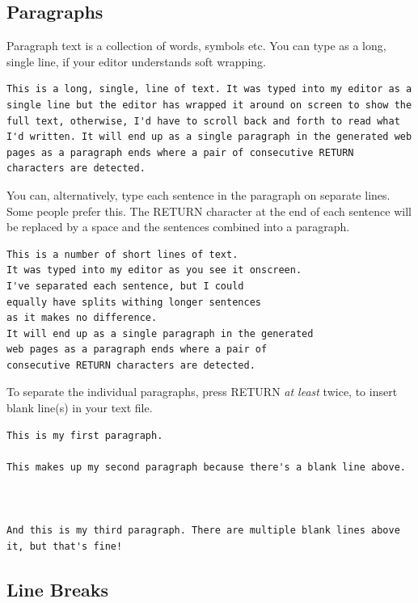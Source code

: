 \subsection{Paragraphs}\label{sect: Paragraphs}

Paragraph text is a collection of words, symbols etc. You can type as a long, single line, if your editor understands soft wrapping.

\begin{lstlisting}[caption={Paragraphs using long lines.},style=myText]
This is a long, single, line of text. It was typed into my editor as a single line but the editor has wrapped it around on screen to show the full text, otherwise, I'd have to scroll back and forth to read what I'd written. It will end up as a single paragraph in the generated web pages as a paragraph ends where a pair of consecutive RETURN characters are detected.
\end{lstlisting}


You can, alternatively, type each sentence in the paragraph on separate lines. Some people prefer this. The RETURN character at the end of each sentence will be replaced by a space and the sentences combined into a paragraph.

\begin{lstlisting}[caption={Paragraphs using short lines.},style=myText]
This is a number of short lines of text.
It was typed into my editor as you see it onscreen.
I've separated each sentence, but I could
equally have splits withing longer sentences
as it makes no difference.
It will end up as a single paragraph in the generated
web pages as a paragraph ends where a pair of
consecutive RETURN characters are detected.
\end{lstlisting}

To separate the individual paragraphs, press RETURN \emph{at least} twice, to insert blank line(s) in your text file.

\begin{lstlisting}[caption={Multiple paragraphs.},style=myText]
This is my first paragraph.

This makes up my second paragraph because there's a blank line above.



And this is my third paragraph. There are multiple blank lines above it, but that's fine!
\end{lstlisting}

\subsection{Line Breaks}\label{sect: Line Breaks}

